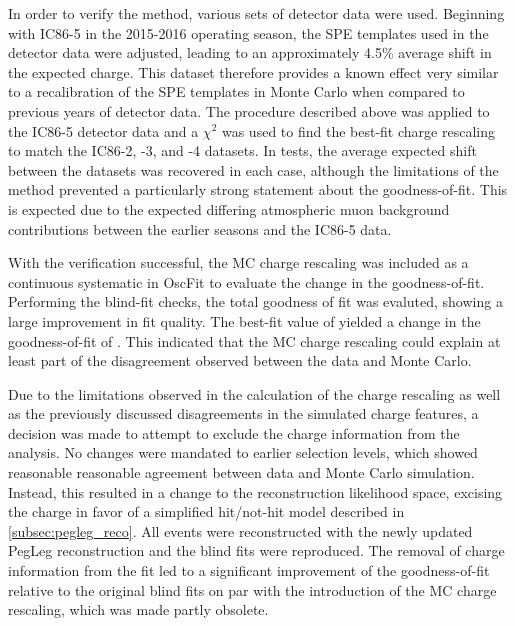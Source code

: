 In order to verify the method, various sets of detector data were used.
Beginning with IC86-5 in the 2015-2016 operating season, the SPE templates used in the detector data were adjusted, leading to an approximately 4.5\% average shift in the expected charge.
This dataset therefore provides a known effect very similar to a recalibration of the SPE templates in Monte Carlo when compared to previous years of detector data.
The procedure described above was applied to the IC86-5 detector data and a $\chi^2$ was used to find the best-fit charge rescaling to match the IC86-2, -3, and -4 datasets.
In tests, the average expected shift between the datasets was recovered in each case, although the limitations of the method prevented a particularly strong statement about the goodness-of-fit.
This is expected due to the expected differing atmospheric muon background contributions between the earlier seasons and the IC86-5 data.

With the verification successful, the MC charge rescaling was included as a continuous systematic in OscFit to evaluate the change in the goodness-of-fit.
Performing the blind-fit checks, the total goodness of fit was evaluted, showing a large improvement in fit quality.
The best-fit value of  yielded a change in the goodness-of-fit of .
This indicated that the MC charge rescaling could explain at least part of the disagreement observed between the data and Monte Carlo.

Due to the limitations observed in the calculation of the charge rescaling as well as the previously discussed disagreements in the simulated charge features, a decision was made to attempt to exclude the charge information from the analysis.
No changes were mandated to earlier selection levels, which showed reasonable reasonable agreement between data and Monte Carlo simulation.
Instead, this resulted in a change to the reconstruction likelihood space, excising the charge in favor of a simplified hit/not-hit model described in \ref{subsec:pegleg_reco}.
All events were reconstructed with the newly updated PegLeg reconstruction and the blind fits were reproduced.
The removal of charge information from the fit led to a significant improvement of the goodness-of-fit relative to the original blind fits on par with the introduction of the MC charge rescaling, which was made partly obsolete.

\label{subsec:flaring_doms}
